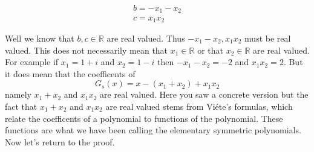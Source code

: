 \documentclass[12pt]{article}
\begin{document}
\begin{align*}
b = -x_1-x_2 \\ 
c = x_1 x_2
\end{align*}

Well we know that $b, c \in \mathbb{R}$ are real valued.  Thus $-x_1-x_2, x_1x_2$ must be real valued.  This does not necessarily mean that $x_1 \in \mathbb{R}$ or that $x_2 \in \mathbb{R}$ are real valued.  For example if $x_1=1+i$ and $x_2 = 1-i$ then $-x_1-x_2=-2$ and $x_1x_2 = 2$.  But it does mean that the coefficents of $$G_s(x) = x-(x_1+x_2)+x_1 x_2$$
namely $x_1+x_2$ and $x_1 x_2$ are real valued.  Here you saw a concrete version but the fact that $x_1+x_2$ and $x_1 x_2$ are real valued stems from Vi\'ete's formulas, which relate the coefficents of a polynomial to functions of the polynomial.  These functions are what we have been calling the elementary symmetric polynomials.  Now let's return to the proof.






%
%
%



%
%
%
\end{document}
